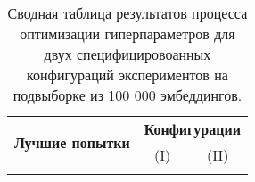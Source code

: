 \begin{table}[!htbp]
\begin{longtable}[c]{|cl|cc|}
    \caption{Сводная таблица результатов процесса оптимизации гиперпараметров для двух специфицировоанных конфигураций экспериментов на подвыборке из 100 000 эмбеддингов.}
    \label{tab:experiment_results}\\
    \hline
    \multicolumn{2}{|c|}{\multirow{2}{*}{\textbf{Лучшие попытки}}} & \multicolumn{2}{c|}{\textbf{Конфигурации}}                                                \\ \cline{3-4}
    \multicolumn{2}{|c|}{}                                     & \multicolumn{1}{c|}{(I)} & \multicolumn{1}{c|}{(II)} \\ \hline
    \endfirsthead

    \endhead

    \hline
    \endfoot

    \endlastfoot


\end{longtable}
\end{table}
